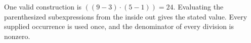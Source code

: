 One valid construction is $\boxed{((9-3)\cdot (5-1))=24}$. Evaluating the parenthesized subexpressions from the inside out gives the stated value. Every supplied occurrence is used once, and the denominator of every division is nonzero.
